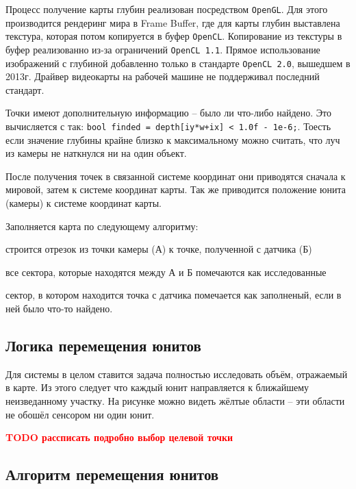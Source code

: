 \newpage

Процесс получение карты глубин реализован посредством \verb|OpenGL|. Для этого 
производится рендеринг мира в Frame Buffer, где для карты глубин выставлена текстура, 
которая потом копируется в буфер \verb|OpenCL|. Копирование из текстуры в буфер реализованно
из-за ограничений \verb|OpenCL 1.1|. Прямое использование изображений с глубиной добавленно
только в стандарте \verb|OpenCL 2.0|, вышедшем в 2013г. Драйвер видеокарты на рабочей машине
не поддерживал последний стандарт.

Точки имеют дополнительную информацию -- было ли что-либо найдено.
Это вычисляется с так: \verb|bool finded = depth[iy*w+ix] < 1.0f - 1e-6;|.
Тоесть если значение глубины крайне близко к максимальному можно считать, что
луч из камеры не наткнулся ни на один объект.

После получения точек в связанной системе координат они приводятся
сначала к мировой, затем к системе координат карты.
Так же приводится положение юнита (камеры) к системе координат карты.

Заполняется карта по следующему алгоритму:
\begin{mintemize}
    \item строится отрезок из точки камеры (А) к точке, полученной с датчика (Б)
    \item все сектора, которые находятся между А и Б помечаются как исследованные
    \item сектор, в котором находится точка с датчика помечается как заполненый,
        если в ней было что-то найдено.
\end{mintemize}

\newpage
\subsection{Логика перемещения юнитов}

Для системы в целом ставится задача полностью исследовать объём, отражаемый в карте.
Из этого следует что каждый юнит направляется к ближайшему неизведанному участку. 
На рисунке можно видеть жёлтые области -- эти области не обошёл сенсором ни один юнит.

\vspace{2cm} 
\textcolor{red}{ \LARGE\textbf{
    TODO \newline
    рассписать подробно выбор целевой точки
}
}

\newpage
\subsection{Алгоритм перемещения юнитов}

